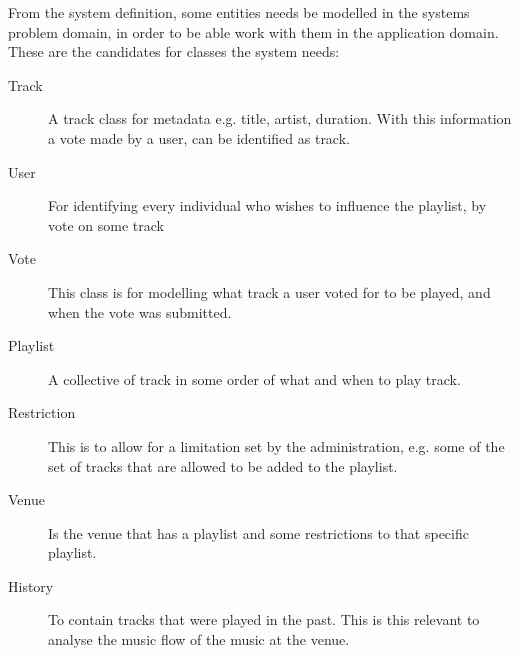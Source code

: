 From the system definition, some entities needs be modelled in the systems problem domain, in order to be able work with them in the application domain. These are the candidates for classes the system needs:
\begin{description}
    \item[Track]
    A track class for metadata e.g. title, artist, duration. With this information a vote made by a user, can be identified as track.
    \item[User]
    For identifying every individual who wishes to influence the playlist, by vote on some track
    \item[Vote]
    This class is for modelling what track a user voted for to be played, and when the vote was submitted.
    \item[Playlist]
    A collective of track in some order of what and when to play track.
    \item[Restriction]
    This is to allow for a limitation set by the administration, e.g. some of the set of tracks that are allowed to be added to the playlist.
    \item[Venue]
    Is the venue that has a playlist and some restrictions to that specific playlist.
    \item[History]
    To contain tracks that were played in the past. This is this
    relevant to analyse the music flow of the music at the venue.
\end{description}
